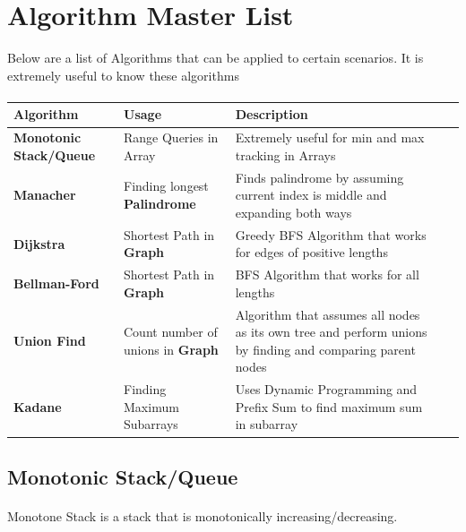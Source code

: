 \documentclass{article}
\begin{document}
\section{Algorithm Master List}

Below are a list of Algorithms that can be applied to certain scenarios. It is extremely useful to know these algorithms

\paragraph{}

\noindent\setlength\tabcolsep{4pt}%
\begin{tabularx}{\linewidth}{|l|*{4}{>{\RaggedRight\arraybackslash}X|}}
  \hline
  \textbf{Algorithm} & \textbf{Usage} & \textbf{Description} \\ [0.5ex]
  \hline
  \textbf{Monotonic Stack/Queue} & Range Queries in Array & Extremely useful for min and max tracking in Arrays \\
  \hline
  \textbf{Manacher} & Finding longest \textbf{Palindrome} & Finds palindrome by assuming current index is middle and expanding both ways \\
  \hline
  \textbf{Dijkstra} & Shortest Path in \textbf{Graph} & Greedy BFS Algorithm that works for edges of positive lengths \\
  \hline
  \textbf{Bellman-Ford} & Shortest Path in \textbf{Graph} & BFS Algorithm that works for all lengths \\
  \hline
  \textbf{Union Find} & Count number of unions in \textbf{Graph} & Algorithm that assumes all nodes as its own tree and perform unions by finding and comparing parent nodes \\
  \hline
  \textbf{Kadane} & Finding Maximum Subarrays & Uses Dynamic Programming and Prefix Sum to find maximum sum in subarray \\
  \hline
\end{tabularx}
\vskip1cm

\subsection{Monotonic Stack/Queue}

\paragraph{}

Monotone Stack is a stack that is monotonically increasing/decreasing.
\end{document}
